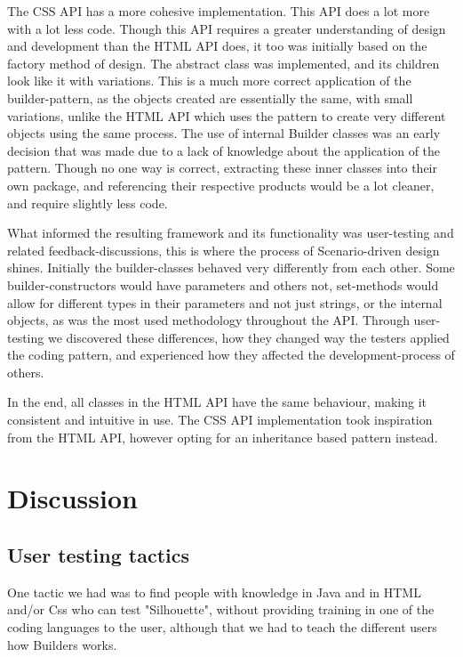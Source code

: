 \documentclass[12pt]{article}
\begin{document}
    The CSS API has a more cohesive implementation. This API does a lot more with a lot less code. Though this API requires a greater understanding of design and development than the HTML API does, it too was initially based on the factory method of design. The abstract class was implemented, and its children look like it with variations. This is a much more correct application of the builder-pattern, as the objects created are essentially the same, with small variations, unlike the HTML API which uses the pattern to create very different objects using the same process.
    The use of internal Builder classes was an early decision that was made due to a lack of knowledge about the application of the pattern. Though no one way is correct, extracting these inner classes into their own package, and referencing their respective products would be a lot cleaner, and require slightly less code.

    What informed the resulting framework and its functionality was user-testing and related feedback-discussions, this is where the process of Scenario-driven design shines. Initially the builder-classes behaved very differently from each other. Some builder-constructors would have parameters and others not, set-methods would allow for different types in their parameters and not just strings, or the internal objects, as was the most used methodology throughout the API. Through user-testing we discovered these differences, how they changed way the testers applied the coding pattern, and experienced how they affected the development-process of others.

    In the end, all classes in the HTML API have the same behaviour, making it consistent and intuitive in use. The CSS API implementation took inspiration from the HTML API, however opting for an inheritance based pattern instead.

\section{Discussion}

    \subsection{User testing tactics}
    One tactic we had was to find people with knowledge in Java and in HTML and/or Css who can test "Silhouette", without providing training in one of the coding languages to the user, although that we had to teach the different users how Builders works.
\end{document}
